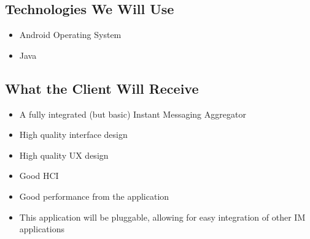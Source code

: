 \subsection{Technologies We Will Use}
    \begin{itemize}
        \item Android Operating System
        \item Java
    \end{itemize}
\subsection{What the Client Will Receive}
    \begin{itemize}
        \item A fully integrated (but basic) Instant Messaging Aggregator
        \item High quality interface design
        \item High quality UX design
        \item Good HCI 
        \item Good performance from the application
        \item This application will be pluggable, allowing for easy integration of other IM applications

    \end{itemize}
